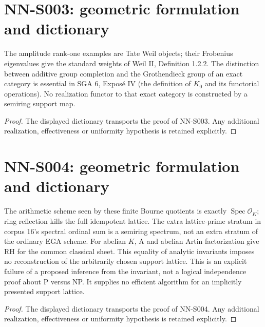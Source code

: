 \section{NN-S003: geometric formulation and dictionary}
\begin{geometricstatement}[NN-S003]
The amplitude rank-one examples are Tate Weil objects; their
Frobenius eigenvalues give the standard weights of Weil II,
Definition 1.2.2. The distinction between additive group completion
and the Grothendieck group of an exact category is essential in
SGA 6, Expos\'e IV (the definition of $K_0$ and its functorial
operations). No realization functor to that exact category is
constructed by a semiring support map.
\end{geometricstatement}
\begin{proof} The displayed dictionary transports the proof of NN-S003. Any additional realization, effectiveness or uniformity hypothesis is retained explicitly.\end{proof}


\section{NN-S004: geometric formulation and dictionary}
\begin{geometricstatement}[NN-S004]
The arithmetic scheme seen by these finite Bourne quotients is
exactly $\operatorname{Spec}\mathcal O_K$; ring reflection kills
the full idempotent lattice. The extra lattice-prime stratum in
corpus 16's spectral ordinal sum is a semiring spectrum, not an
extra stratum of the ordinary EGA scheme. For abelian $K$, A and
abelian Artin factorization give RH for the common classical
sheet. This equality of analytic invariants imposes no reconstruction
of the arbitrarily chosen support lattice. This is an explicit
failure of a proposed inference from the invariant, not a logical
independence proof about P versus NP. It supplies no efficient
algorithm for an implicitly presented support lattice.
\end{geometricstatement}
\begin{proof} The displayed dictionary transports the proof of NN-S004. Any additional realization, effectiveness or uniformity hypothesis is retained explicitly.\end{proof}



